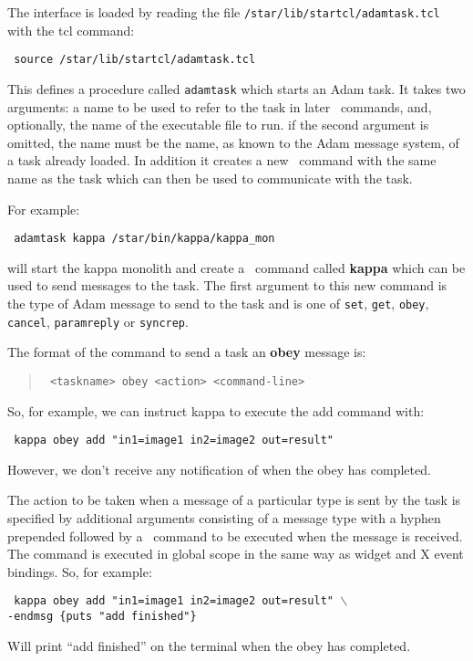 The interface is loaded by reading the file
{\tt{/star/lib/startcl/adamtask.tcl}} with the tcl command:

\begin{tquote}{\tt
source /star/lib/startcl/adamtask.tcl
}\end{tquote}

This defines a procedure called {\tt adamtask} which starts an Adam
task. It takes two arguments: a name to be used to refer to the task in later
\Tcl\ commands, and, optionally, the name of the executable file to run.
if the second argument is omitted, the name must be the name, as known to the
Adam message system, of a task already loaded.
In addition it
creates a new \Tcl\ command with the same name as the task which can then be
used to communicate with the task.

For example:
\begin{tquote}{\tt
adamtask kappa /star/bin/kappa/kappa\_mon
}\end{tquote}
will start the kappa monolith and create a \Tcl\ command called {\bf kappa}
which can be used to send messages to the task.
The first argument to this new command is the type of Adam message to
send to the task and is one of {\tt set}, {\tt get}, {\tt obey}, {\tt
cancel}, {\tt paramreply} or {\tt syncrep}.

The format of the command to send a task an {\bf obey} message is:
\begin{quote}{\tt
<taskname> obey <action> <command-line>
}\end{quote}
So, for example, we can instruct kappa to execute the add command with:
\begin{tquote}{\tt
kappa obey add "in1=image1 in2=image2 out=result"
}\end{tquote}
However, we don't receive any notification of when the obey has
completed.

The action to be taken when a message of a particular type is sent by the
task is specified by additional arguments consisting of a message type
with a hyphen prepended followed by a \Tcl\ command to be executed when the
message is received. The command is executed in global scope in the same
way as widget and X event bindings. So, for example:
\begin{tquote}{\tt
kappa obey add "in1=image1 in2=image2 out=result" $\backslash$\\
\hspace*{2em}-endmsg \{puts "add finished"\}
}\end{tquote}
Will print ``add finished'' on the terminal when the obey has completed.

